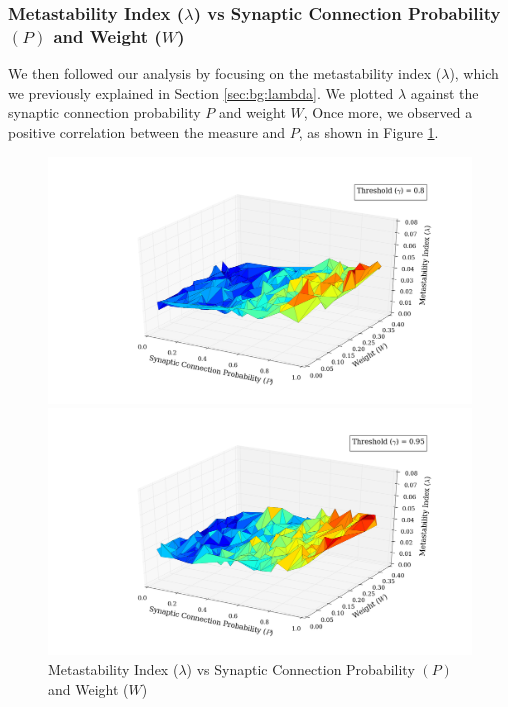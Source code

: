 \documentclass[a4paper,11pt]{article}
\begin{document}
\subsubsection{Metastability Index ($\lambda$) vs Synaptic Connection Probability $(P)$ and Weight ($W$)}
\label{sec:app:snn:res:lambda}
We then followed our analysis by focusing on the metastability index ($\lambda$), which we previously explained in Section \ref{sec:bg:lambda}. We plotted $\lambda$ against the synaptic connection probability $P$ and weight $W$, Once more, we observed a positive correlation between the measure and $P$, as shown in Figure \ref{fig:p_w_lambda_all}.

\begin{figure}[H] 
	\begin{minipage}[b]{0.5\linewidth}
		\begin{center}
		\includegraphics[scale = 0.2]{figures/snn/p_w_lambda_8_1}
		\end{center}
		\vspace{4ex}
	\end{minipage}
	\begin{minipage}[b]{0.5\linewidth}
		\begin{center}
		\includegraphics[scale = 0.2]{figures/snn/p_w_lambda_95_1}
		\end{center}
		\vspace{4ex}
	\end{minipage}
	\caption{
			Metastability Index ($\lambda$) vs Synaptic Connection Probability $(P)$ and Weight ($W$)
			\label{fig:p_w_lambda_all}
		}
\end{figure}
\end{document}
